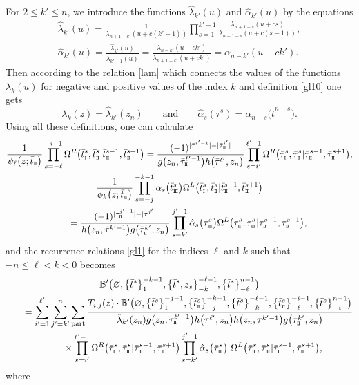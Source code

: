 \documentclass[10pt,a4paper]{amsart}
\newcommand{\so}{\scriptscriptstyle \rm I}
\newcommand{\st}{\scriptscriptstyle \rm I\hspace{-1pt}I}
\newcommand{\sth}{\scriptscriptstyle \rm I\hspace{-1pt}I\hspace{-1pt}I}
\newcommand{\bt}{{\bar t}}
\newcommand{\btt}{{\bar\tau}}
\theoremstyle{definition}
\def\BB{{\mathbb{B}}}
\def\r#1{\eqref{#1}}
\def\Oml{\Omega^L}
\def\Omr{\Omega^R}
\def\lp{{\ell'}}
\def\kp{{k'}}
\def\ip{{i'}}
\def\jp{{j'}}
\def\hlam{\hat{\lambda}}
\def\halp{\hat{\alpha}}
\begin{document}
For $2\leq\kp\leq n$, we introduce the functions $\hlam_\kp(u)$
and $\halp_{\kp}(u)$ by the equations
\begin{gather*}%
\hlam_\kp(u)=\frac{1}{\lambda_{n+1-\kp}(u+c(\kp-1))}
\prod_{s=1}^{\kp-1}\frac{\lambda_{n+1-s}(u+cs)}{\lambda_{n+1-s}(u+c(s-1))},\\
\halp_{\kp}(u)=\frac{\hlam_\kp(u)}{\hlam_{\kp+1}(u)}=
\frac{\lambda_{n-\kp}(u+c\kp)}{\lambda_{n+1-\kp}(u+c\kp)}
 ={\alpha_{n-\kp}(u+c\kp)} .
\end{gather*}
Then according to the relation \r{lam} which connects the values of the functions
$\lambda_k(u)$ for negative and positive values of the index $k$
and definition \r{gl10} one gets
\begin{equation}\label{gl13}
\lambda_k(z)=\hlam_\kp(z_n)\qquad \mbox{and}\qquad
\halp_s(\btt^s)=\alpha_{n-s}\bigl(\bt^{n-s}\bigr) .
\end{equation}
Using all these definitions, one can calculate
\begin{gather*}%
\frac{1}{\psi_\ell\bigl(z;\bt_{\st}\bigr)}
\prod_{s=-\ell}^{-i-1}\Omr\bigl(\bt^s_{\so},\bt^s_{{\st}}|\bt^{s-1}_{\st},\bt^{s+1}_{\st}\bigr)
=\frac{(-1)^{|\btt^{\ip-1}|-|\btt^{\ip}_{\st}|}}
{g\bigl(z_n,\btt^{\lp-1}_{\st}\bigr) h\bigl(\btt^{\lp},z_n\bigr)}
\prod_{s=\ip}^{\lp-1}\Omr\bigl(\btt^s_{\so},\btt^s_{{\st}}|\btt^{s-1}_{\st},\btt^{s+1}_{\st}\bigr) ,
\\
\frac{1}{\phi_k\bigl(z;\bt_{\st}\bigr)}
\prod_{s=-j}^{-k-1}\alpha_s\bigl(\bt^s_{\sth}\bigr)
\Oml\bigl(\bt^s_{\so},\bt^s_{{\st}}|\bt^{s-1}_{\st},\bt^{s+1}_{\st}\bigr)
\\
\qquad= \frac{(-1)^{|\btt^{\jp-1}_{\st}|-|\btt^{\jp}|}}
{h\bigl(z_n,\btt^{\kp-1}\bigr) g\bigl(\btt^{\kp}_{\st},z_n\bigr)}
\prod_{s=\kp}^{\jp-1}\halp_s\bigl(\btt^s_{\sth}\bigr)
\Oml\bigl(\btt^s_{\st},\btt^s_{{\sth}}|\btt^{s-1}_{\st},\btt^{s+1}_{\st}\bigr),
\end{gather*}
and the recurrence relations \r{gl1}
for the indices $\ell$ and $k$ such that
$-n\leq \ell<k<0$ becomes
\begin{gather}
\BB'\bigl(\varnothing,\bigl\{\bt^s\bigr\}_1^{-k-1},\bigl\{\bt^s,z_s\bigr\}_{-k}^{-\ell-1},\bigl\{\bt^s\bigr\}_{-\ell}^{n-1}\bigr)\nonumber\\
\qquad= \sum_{\ip=1}^\lp\sum_{\jp=\kp}^n \sum_{\rm part}
\frac{T_{i,j}(z)
\cdot\BB'\bigl(\varnothing,\bigl\{\bt^s\bigr\}_{1}^{-j-1},
\bigl\{\bt^s_{\st}\bigr\}_{-j}^{-k-1},
\bigl\{\bt^s\bigr\}_{-k}^{-\ell-1},\bigl\{\bt^s_{\st}\bigr\}_{-\ell}^{-i-1},\bigl\{\bt^s\bigr\}_{-i}^{n-1}\bigr)}
{\hlam_\kp(z_n) g\bigl(z_n,\btt^{\lp-1}_{\st}\bigr) h\bigl(\btt^\lp,z_n\bigr)
 h\bigl(z_n,\btt^{\kp-1}\bigr) g\bigl(\btt^\kp_{\st},z_n\bigr)}\nonumber\\
\phantom{\qquad=}{}\times
\prod_{s=\ip}^{\lp-1}\Omr\bigl(\btt^s_{\so},\btt^s_{\st}|\btt^{s-1}_{\st},\btt^{s+1}_{\st}\bigr)
\prod_{s=\kp}^{\jp-1}\halp_s\bigl(\btt^s_{\sth}\bigr)\
\Oml\bigl(\btt^s_{\st},\btt^s_{\sth}|\btt^{s-1}_{\st},\btt^{s+1}_{\st}\bigr),\label{gl-recpp}
\end{gather}
where
\smash{$
 \BB'\bigl(\bt\bigr) = (-1)^{\sum_{s=1}^{n-2} |\bt^{s}| |\bt^{s+1}| + \sum_{s=1}^{n-1} |\bt^{s}|} \BB\bigl(\bt\bigr)$}.
\end{document}
